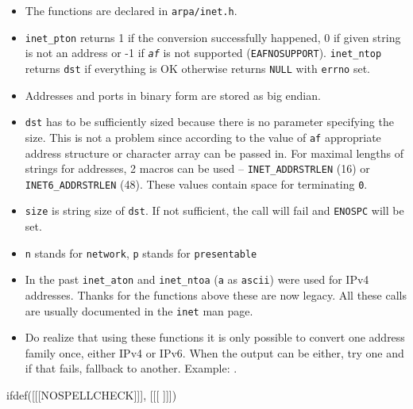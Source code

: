 \begin{itemize}
\item The functions are declared in \texttt{arpa/inet.h}.
\item \texttt{inet\_pton} returns 1 if the conversion successfully happened,
0 if given string is not an address or -1 if \emph{\texttt{af}} is not supported
(\texttt{EAFNOSUPPORT}). \texttt{inet\_ntop} returns \texttt{dst} if everything
is OK otherwise returns \texttt{NULL} with \texttt{errno} set.
\item Addresses and ports in binary form are stored as big endian.
\item \texttt{dst} has to be sufficiently sized because there is no parameter
specifying the size. This is not a problem since according to the value of
\texttt{af} appropriate address structure or character array can be passed in.
For maximal lengths of strings for addresses, 2 macros can be used --
\texttt{INET\_ADDRSTR\-LEN} (16) or \texttt{INET6\_ADDRSTRLEN} (48). 
These values contain space for terminating \texttt{\bs{}0}.
\item \texttt{size} is string size of \texttt{dst}. If not sufficient, the call
will fail and \texttt{ENOSPC} will be set.
\item \texttt{n} stands for \texttt{network}, \texttt{p} stands for
\texttt{presentable}
\item In the past \texttt{inet\_aton} and \texttt{inet\_ntoa} (\texttt{a} as
\texttt{ascii}) were used for IPv4 addresses. Thanks for the functions above
these are now legacy. All these calls are usually documented in the
\texttt{inet} man page.
\item \label{ADDRESSES} Do realize that using these functions it is only
possible to convert one address family once, either IPv4 or IPv6.
When the output can be either, try one and if that fails, fallback to another.
Example: .
\end{itemize}


ifdef([[[NOSPELLCHECK]]], [[[
]]])

